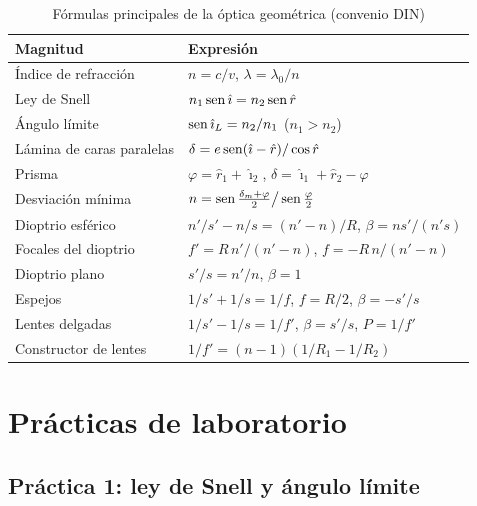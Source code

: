 \begin{table}[H]
    \centering
    \caption{Fórmulas principales de la óptica geométrica (convenio DIN)}
    \vspace{-5pt}
    \begin{tabular}{@{}lL{10cm}@{}}
        \toprule
        \textbf{Magnitud} & \textbf{Expresión} \\
        \midrule
        Índice de refracción & \(n = c/v\), \quad \(\lambda = \lambda_0/n\) \\[3pt]
        Ley de Snell & \(n_1\operatorname{sen}\hat{\imath} = n_2\operatorname{sen}\hat r\) \\[3pt]
        Ángulo límite & \(\operatorname{sen}\hat{\imath}_L = n_2/n_1\) \quad (\(n_1 > n_2\)) \\[3pt]
        Lámina de caras paralelas & \(\delta = e\operatorname{sen}(\hat{\imath} - \hat r)/\cos\hat r\) \\[3pt]
        Prisma & \(\varphi = \hat r_1 + \hat{\imath}_2\), \quad \(\delta = \hat{\imath}_1 + \hat r_2 - \varphi\) \\[3pt]
        Desviación mínima & \(n = \operatorname{sen}\frac{\delta_m + \varphi}{2}\big/\operatorname{sen}\frac{\varphi}{2}\) \\[3pt]
        Dioptrio esférico & \(n'/s' - n/s = (n' - n)/R\), \quad \(\beta = n s'/(n' s)\) \\[3pt]
        Focales del dioptrio & \(f' = R\,n'/(n' - n)\), \quad \(f = -R\,n/(n' - n)\) \\[3pt]
        Dioptrio plano & \(s'/s = n'/n\), \quad \(\beta = 1\) \\[3pt]
        Espejos & \(1/s' + 1/s = 1/f\), \quad \(f = R/2\), \quad \(\beta = -s'/s\) \\[3pt]
        Lentes delgadas & \(1/s' - 1/s = 1/f'\), \quad \(\beta = s'/s\), \quad \(P = 1/f'\) \\[3pt]
        Constructor de lentes & \(1/f' = (n - 1)(1/R_1 - 1/R_2)\) \\
        \bottomrule
    \end{tabular}
    \label{tab:opt-resumen}
\end{table}

\section{Prácticas de laboratorio}\label{sec:opt-practicas}

\subsection{Práctica 1: ley de Snell y ángulo límite}\label{subsec:opt-practica-snell}

